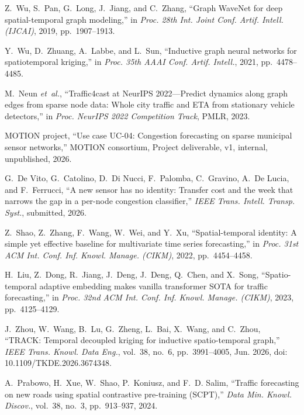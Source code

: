 Z.~Wu, S.~Pan, G.~Long, J.~Jiang, and C.~Zhang, ``Graph WaveNet for deep spatial-temporal graph modeling,'' in \emph{Proc. 28th Int. Joint Conf. Artif. Intell. (IJCAI)}, 2019, pp.~1907--1913.

Y.~Wu, D.~Zhuang, A.~Labbe, and L.~Sun, ``Inductive graph neural networks for spatiotemporal kriging,'' in \emph{Proc. 35th AAAI Conf. Artif. Intell.}, 2021, pp.~4478--4485.

M.~Neun \emph{et~al.}, ``Traffic4cast at NeurIPS 2022---Predict dynamics along graph edges from sparse node data: Whole city traffic and ETA from stationary vehicle detectors,'' in \emph{Proc. NeurIPS 2022 Competition Track}, PMLR, 2023.

MOTION project, ``Use case UC-04: Congestion forecasting on sparse municipal sensor networks,'' MOTION consortium, Project deliverable, v1, internal, unpublished, 2026.

G.~De Vito, G.~Catolino, D.~Di Nucci, F.~Palomba, C.~Gravino, A.~De Lucia, and F.~Ferrucci, ``A new sensor has no identity: Transfer cost and the week that narrows the gap in a per-node congestion classifier,'' \emph{IEEE Trans. Intell. Transp. Syst.}, submitted, 2026.

Z.~Shao, Z.~Zhang, F.~Wang, W.~Wei, and Y.~Xu, ``Spatial-temporal identity: A simple yet effective baseline for multivariate time series forecasting,'' in \emph{Proc. 31st ACM Int. Conf. Inf. Knowl. Manage. (CIKM)}, 2022, pp.~4454--4458.

H.~Liu, Z.~Dong, R.~Jiang, J.~Deng, J.~Deng, Q.~Chen, and X.~Song, ``Spatio-temporal adaptive embedding makes vanilla transformer SOTA for traffic forecasting,'' in \emph{Proc. 32nd ACM Int. Conf. Inf. Knowl. Manage. (CIKM)}, 2023, pp.~4125--4129.

J.~Zhou, W.~Wang, B.~Lu, G.~Zheng, L.~Bai, X.~Wang, and C.~Zhou, ``TRACK: Temporal decoupled kriging for inductive spatio-temporal graph,'' \emph{IEEE Trans. Knowl. Data Eng.}, vol.~38, no.~6, pp.~3991--4005, Jun. 2026, doi: 10.1109/TKDE.2026.3674348.

A.~Prabowo, H.~Xue, W.~Shao, P.~Koniusz, and F.~D. Salim, ``Traffic forecasting on new roads using spatial contrastive pre-training (SCPT),'' \emph{Data Min. Knowl. Discov.}, vol.~38, no.~3, pp.~913--937, 2024.

